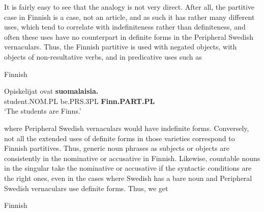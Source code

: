 It is fairly easy to see that the analogy is not very direct. After all, the partitive case in Finnish is a case, not an article, and as such it has rather many different uses, which tend to correlate with indefiniteness rather than definiteness, and often these uses have no counterpart in definite forms in the Peripheral Swedish vernaculars. Thus, the Finnish partitive is used with negated objects, with objects of non-resultative verbs, and in predicative uses such as 


\item 

Finnish



 \ea\label{}
\gll Opiskelijat  ovat  \textbf{suomalaisia.}\\


student.NOM.PL  be.PRS.3PL  \textbf{Finn.PART.PL}\\

\glt ‘The students are Finns.’

\z

where Peripheral Swedish vernaculars would have indefinite forms. Conversely, not all the extended uses of definite forms in those varieties correspond to Finnish partitives. Thus, generic noun phrases as subjects or objects are consistently in the nominative or accusative in Finnish. Likewise, countable nouns in the singular take the nominative or accusative if the syntactic conditions are the right ones, even in the cases where Swedish has a bare noun and Peripheral Swedish vernaculars use definite forms. Thus, we get


\item 

Finnish


